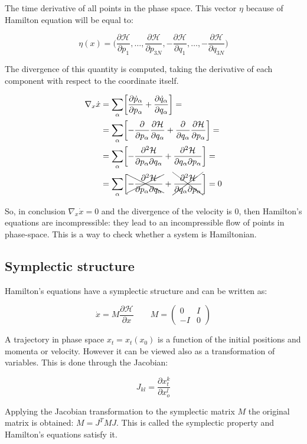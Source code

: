 	The time derivative of all points in the phase space.
	This vector $\eta$ because of Hamilton equation will be equal to:

	$$\eta(x) = \biggl(\frac{\partial\mathcal{H}}{\partial p_1}, \dots, \frac{\partial\mathcal{H}}{\partial p_{3N}}, -\frac{\partial\mathcal{H}}{\partial q_1}, \dots, -\frac{\partial\mathcal{H}}{\partial q_{3N}}\biggr)$$

	The divergence of this quantity is computed, taking the derivative of each component with respect to the coordinate itself.

	\begin{align*}
		\nabla_x\dot{x} &= \sum\limits_\alpha\biggl[\frac{\partial\dot{p}_\alpha}{\partial p_\alpha} + \frac{\partial\dot{q}_\alpha}{\partial q_\alpha}\biggr] =\\
										&= \sum\limits_\alpha\biggl[-\frac{\partial}{\partial p_\alpha}\frac{\partial\mathcal{H}}{\partial q_\alpha} + \frac{\partial}{\partial q_\alpha}\frac{\partial\mathcal{H}}{\partial p_\alpha}\biggr] =\\
										&= \sum\limits_\alpha\biggl[-\frac{\partial^2\mathcal{H}}{\partial p_\alpha\partial q_\alpha} + \frac{\partial^2\mathcal{H}}{\partial q_\alpha\partial p_\alpha}\biggr] = \\
										&= \sum\limits_\alpha\biggl[\xcancel{-\frac{\partial^2\mathcal{H}}{\partial p_\alpha\partial q_\alpha}} + \xcancel{\frac{\partial^2\mathcal{H}}{\partial q_\alpha\partial p_\alpha}}\biggr] = 0
	\end{align*}

	So, in conclusion $\nabla_x\dot{x} = 0$ and the divergence of the velocity is $0$, then Hamilton's equations are incompressible: they lead to an incompressible flow of points in phase-space.
	This is a way to check whether a system is Hamiltonian.

	\subsection{Symplectic structure}
	Hamilton's equations have a symplectic structure and can be written as:

	$$\dot{x} = M\frac{\partial\mathcal{H}}{\partial x}\qquad M = \begin{pmatrix} 0 & I\\ -I & 0\end{pmatrix}$$

	A trajectory in phase space $x_t = x_t(x_0)$ is a function of the initial positions and momenta or velocity.
	However it can be viewed also as a transformation of variables.
	This is done through the Jacobian:

	$$J_{kl} = \frac{\partial x_t^k}{\partial x_o^l}$$

	Applying the Jacobian transformation to the symplectic matrix $M$ the original matrix is obtained: $M = J^TMJ$.
	This is called the symplectic property and Hamilton's equations satisfy it.
